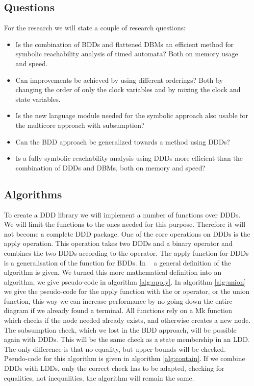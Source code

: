 \subsection{Questions}
For the research we will state a couple of research questions:
{\renewcommand\labelitemi{--}
	\begin{itemize}
		\item Is the combination of BDDs and flattened DBMs an efficient method for symbolic reachability analysis of timed automata? Both on memory usage and speed.
		\item Can improvements be achieved by using different orderings? Both by changing the order of only the clock variables and by mixing the clock and state variables.
		\item Is the new language module needed for the symbolic approach also usable for the multicore approach with subsumption?
		\item Can the BDD approach be generalized towards a method using DDDs?
		\item Is a fully symbolic reachability analysis using DDDs more efficient than the combination of DDDs and DBMs, both on memory and speed?
	\end{itemize}
}

\subsection{Algorithms}
To create a DDD library we will implement a number of functions over DDDs. We will limit the functions to the ones needed for this purpose. Therefore it will not become a complete DDD package. One of the core operations on DDDs is the apply operation. This operation takes two DDDs and a binary operator and combines the two DDDs according to the operator. The apply function for DDDs is a generalisation of the function for BDDs. In ~\cite{ddds} a general definition of the algorithm is given. We turned this more mathematical definition into an algorithm, we give pseudo-code in algorithm \ref{alg:apply}. In algorithm \ref{alg:union} we give the pseudo-code for the apply function with the or operator, or the union function, this way we can increase performance by no going down the entire diagram if we already found a terminal. All functions rely on a Mk function which checks if the node needed already exists, and otherwise creates a new node.
The subsumption check, which we lost in the BDD approach, will be possible again with DDDs. This will be the same check as a state membership in an LDD. The only difference is that no equality, but upper bounds will be checked. Pseudo-code for this algorithm is given in algorithm \ref{alg:contain}. If we combine DDDs with LDDs, only the correct check has to be adapted, checking for equalities, not inequalities, the algorithm will remain the same.

